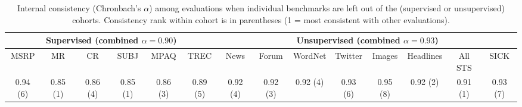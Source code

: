 \hspace*{-2cm}
\begin{table*}[ht]
\begin{adjustwidth}{-1cm}{}
\renewcommand{\tabcolsep}{4.6pt}
\footnotesize
\begin{center}
      {
        \begin{tabular}{cccccc|cccccccc}
          \multicolumn{6}{c|}{Supervised (combined \(\alpha = 0.90\))} & \multicolumn{8}{c}{Unsupervised (combined \(\alpha = 0.93\))} \\
          \hline
                     MSRP & MR & CR & SUBJ & MPAQ & TREC & News & Forum & WordNet & Twitter & Images & Headlines & All STS  & SICK \\
                                          \footnotesize  0.94 (6) &	0.85 (1)	 &0.86 (4)	 &0.85 (1) &	0.86	(3) &0.89 (5) &	0.92	(4) &0.92 (3)	 &0.92 (4) &	0.93 (6)  &	0.95 (8)	 &0.92 (2)  &	0.91 (1)  &0.93 (7) \\
                                          \hline
        \end{tabular}
    }
    \caption{\label{consistency} Internal consistency (Chronbach's \(\alpha\)) among evaluations when individual benchmarks are left out of the (supervised or unsupervised) cohorts. Consistency rank within cohort is in parentheses (1 = most consistent with other evaluations).}
  \end{center}
  \vspace*{-4ex}
  \end{adjustwidth}
\end{table*}

